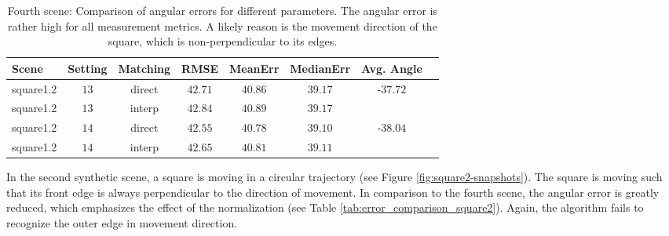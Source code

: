 \begin{table}[tb]
	\centering
		\begin{tabular}{lccccccc}
Scene & Setting & Matching & RMSE & MeanErr & MedianErr & Avg. Angle \\
\hline  \hline
square1.2 & $13$ & direct & $42.71$ & $40.86$ & $39.17$ & -$37.72$ & \\
square1.2 & $13$ & interp & $42.84$ & $40.89$ & $39.17$ &  & \\
square1.2 & $14$ & direct & $42.55$ & $40.78$ & $39.10$ & -$38.04$ & \\
square1.2 & $14$ & interp & $42.65$ & $40.81$ & $39.11$ &  & \\
		\end{tabular}
	\caption[Fourth scene: Comparison of angular errors for different parameters.]{Fourth scene: Comparison of angular errors for different parameters.
	The angular error is rather high for all measurement metrics.
	A likely reason is the movement direction of the square, which is non-perpendicular to its edges.}
	\label{tab:error_comparison_square12}
\end{table}

In the second synthetic scene, a square is moving in a circular trajectory (see Figure \ref{fig:square2-snapshots}).
The square is moving such that its front edge is always perpendicular to the direction of movement.
In comparison to the fourth scene, the angular error is greatly reduced, which emphasizes the effect of the normalization (see Table \ref{tab:error_comparison_square2}).
Again, the algorithm fails to recognize the outer edge in movement direction.

